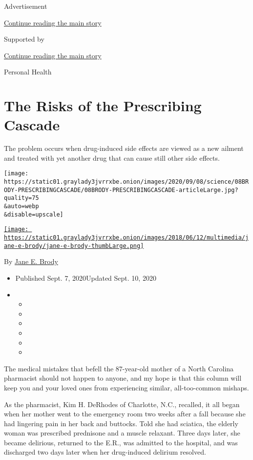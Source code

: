 Advertisement

\protect\hyperlink{after-top}{Continue reading the main story}

Supported by

\protect\hyperlink{after-sponsor}{Continue reading the main story}

Personal Health

\hypertarget{the-risks-of-the-prescribing-cascade}{%
\section{The Risks of the Prescribing
Cascade}\label{the-risks-of-the-prescribing-cascade}}

The problem occurs when drug-induced side effects are viewed as a new
ailment and treated with yet another drug that can cause still other
side effects.

\texttt{[image: https://static01.graylady3jvrrxbe.onion/images/2020/09/08/science/08BRODY-PRESCRIBINGCASCADE/08BRODY-PRESCRIBINGCASCADE-articleLarge.jpg?quality=75\\\&auto=webp\\\&disable=upscale]}

\href{https://www.nytimes3xbfgragh.onion/by/jane-e-brody}{\texttt{[image: https://static01.graylady3jvrrxbe.onion/images/2018/06/12/multimedia/jane-e-brody/jane-e-brody-thumbLarge.png]}}

By \href{https://www.nytimes3xbfgragh.onion/by/jane-e-brody}{Jane E.
Brody}

\begin{itemize}
\item
  Published Sept. 7, 2020Updated Sept. 10, 2020
\item
  \begin{itemize}
  \item
  \item
  \item
  \item
  \item
  \item
  \end{itemize}
\end{itemize}

The medical mistakes that befell the 87-year-old mother of a North
Carolina pharmacist should not happen to anyone, and my hope is that
this column will keep you and your loved ones from experiencing similar,
all-too-common mishaps.

As the pharmacist, Kim H. DeRhodes of Charlotte, N.C., recalled, it all
began when her mother went to the emergency room two weeks after a fall
because she had lingering pain in her back and buttocks. Told she had
sciatica, the elderly woman was prescribed prednisone and a muscle
relaxant. Three days later, she became delirious, returned to the E.R.,
was admitted to the hospital, and was discharged two days later when her
drug-induced delirium resolved.

